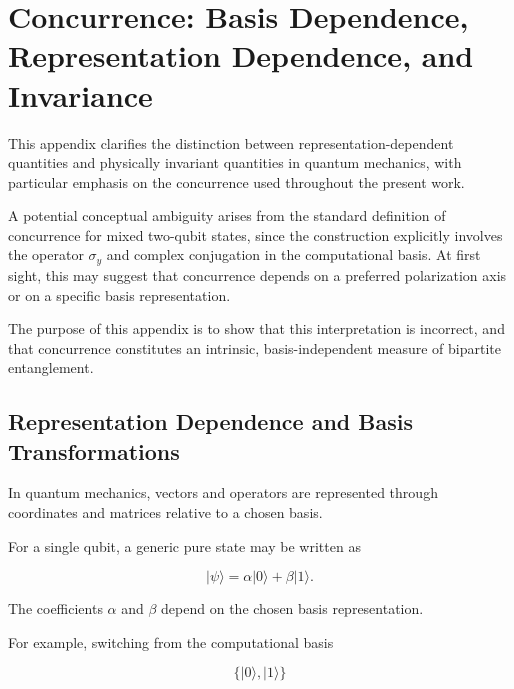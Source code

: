 
\chapter{Concurrence: Basis Dependence, Representation Dependence, and Invariance}

This appendix clarifies the distinction between representation-dependent quantities and physically invariant quantities in quantum mechanics, with particular emphasis on the concurrence used throughout the present work.

\medskip

A potential conceptual ambiguity arises from the standard definition of concurrence for mixed two-qubit states, since the construction explicitly involves the operator \( \sigma_y \) and complex conjugation in the computational basis. At first sight, this may suggest that concurrence depends on a preferred polarization axis or on a specific basis representation.

The purpose of this appendix is to show that this interpretation is incorrect, and that concurrence constitutes an intrinsic, basis-independent measure of bipartite entanglement.


\section*{Representation Dependence and Basis Transformations}

In quantum mechanics, vectors and operators are represented through coordinates and matrices relative to a chosen basis.

For a single qubit, a generic pure state may be written as

\[
|\psi\rangle
=
\alpha |0\rangle
+
\beta |1\rangle.
\]

The coefficients \( \alpha \) and \( \beta \) depend on the chosen basis representation.

For example, switching from the computational basis

\[
\{|0\rangle, |1\rangle\}
\]


